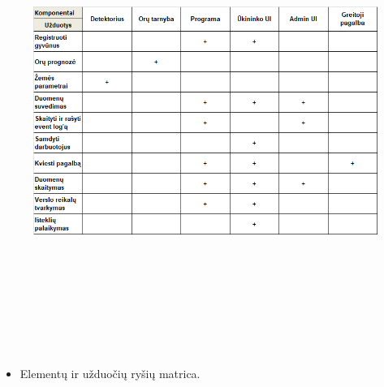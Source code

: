 \documentclass[oneside]{VUMIFPSkursinis}
\begin{document}
	\begin{figure}[H]
	\centering	
\includegraphics[width=15cm,height=15cm,keepaspectratio]{elementu_ir_uzd_matrica.png}
\caption{}
\label{fig:elementu_ir_uzd_matrica}
\end{figure}
\begin{itemize}
		\item Elementų ir užduočių ryšių matrica.
\end{itemize}

\pagebreak
		
\end{document}
